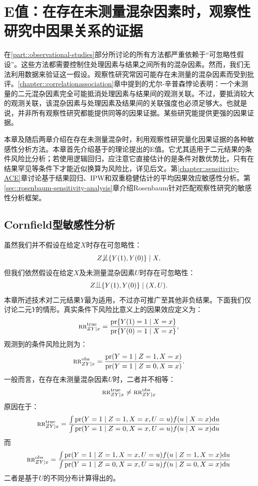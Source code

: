 
\chapter{E值：在存在未测量混杂因素时，观察性研究中因果关系的证据}
\label{chapter::evalue}


在\ref{part::observational-studies}部分所讨论的所有方法都严重依赖于“可忽略性假设”。这些方法都需要控制住处理因素与结果之间所有的混杂因素。然而，我们无法利用数据来验证这一假设。观察性研究常因可能存在未测量的混杂因素而受到批评。\ref{chapter::correlationassociation}章中提到的尤尔-辛普森悖论表明：一个未测量的二元混杂因素完全可能抵消处理因素与结果间的观测关联。不过，要抵消较大的观测关联，该混杂因素与处理因素及结果间的关联强度也必须足够大。也就是说，并非所有观察性研究都能提供同等的因果证据。某些研究能提供更强的因果证据。 


本章及随后两章介绍在存在未测量混杂时，利用观察性研究量化因果证据的各种敏感性分析方法。本章首先介绍\citet{vanderweele2017sensitivity}基于\citet{ding2016sensitivity}的理论提出的E值。它尤其适用于二元结果的条件风险比分析；若使用逻辑回归，应注意它直接估计的是条件对数优势比，只有在结果罕见等条件下才能近似换算为风险比，详见后文。第\ref{chapter::sensitivity-ACE}章讨论基于结果回归、IPW和双重稳健估计的平均因果效应敏感性分析。第\ref{sec::rosenbaum-sensitivity-analysis}章介绍Rosenbaum针对匹配观察性研究的敏感性分析框架。 






\section{Cornfield型敏感性分析}

虽然我们并不假设在给定$X$时存在可忽略性：
$$
Z\nind \{  Y(1), Y(0) \} \mid X ,
$$
但我们依然假设在给定$X$及未测量混杂因素$U$时存在可忽略性：
$$
Z\ind \{  Y(1), Y(0) \} \mid (X, U) . 
$$
本章所述技术对二元结果$Y$最为适用，不过亦可推广至其他非负结果\citep{ding2016sensitivity}。下面我们仅讨论二元$Y$的情形。真实条件下风险比意义上的因果效应定义为：
$$
\textsc{rr}_{ZY\mid x}^{\textup{true}} = \frac{  \textup{pr}\{ Y(1) = 1\mid X=x  \} }{ \textup{pr}\{ Y(0) = 1\mid X=x  \} },
$$
观测到的条件风险比则为：
$$
\textsc{rr}_{ZY\mid x}^{\textup{obs}} = \frac{  \textup{pr}( Y  = 1\mid Z=1, X=x  ) }{ \textup{pr}( Y  = 1\mid  Z=0, X=x  ) }.
$$
一般而言，在存在未测量混杂因素$U$时，二者并不相等：
$$
\textsc{rr}_{ZY\mid x}^{\textup{true}}  \neq \textsc{rr}_{ZY\mid x}^{\textup{obs}} 
$$ 
原因在于：
$$
\textsc{rr}_{ZY\mid x}^{\textup{true}} = \frac{  \int  \textup{pr}( Y = 1\mid Z=1, X=x, U=u  )  f(u \mid X=x) \textup{d} u }
{ \int \textup{pr}( Y = 1\mid Z=0,  X=x , U=u  )  f(u \mid X=x) \textup{d} u }
$$
而
$$
\textsc{rr}_{ZY\mid x}^{\textup{obs}} = \frac{ \int   \textup{pr}( Y  = 1\mid Z=1, X=x , U=u ) f(u \mid Z=1, X=x) \textup{d} u   }
{ \int  \textup{pr}( Y  = 1\mid  Z=0, X=x, U=u  ) f(u \mid Z=0, X=x) \textup{d} u  } 
$$
二者是基于$U$的不同分布计算得出的。 


